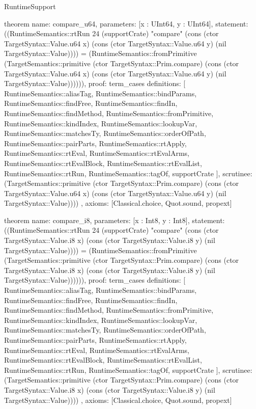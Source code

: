 \begin{lexlean}{RuntimeSupport}
\begin{semanticmodule}
theorem{
  name: compare_u64,
  parameters: [x : UInt64, y : UInt64],
  statement: ((RuntimeSemantics::rtRun 24 (supportCrate) "compare" (cons (ctor TargetSyntax::Value.u64 x) (cons (ctor TargetSyntax::Value.u64 y) (nil TargetSyntax::Value)))) = (RuntimeSemantics::fromPrimitive (TargetSemantics::primitive (ctor TargetSyntax::Prim.compare) (cons (ctor TargetSyntax::Value.u64 x) (cons (ctor TargetSyntax::Value.u64 y) (nil TargetSyntax::Value)))))),
  proof: term_cases{
    definitions: [
      RuntimeSemantics::aliasTag,
      RuntimeSemantics::bindParams,
      RuntimeSemantics::findFree,
      RuntimeSemantics::findIn,
      RuntimeSemantics::findMethod,
      RuntimeSemantics::fromPrimitive,
      RuntimeSemantics::kindIndex,
      RuntimeSemantics::lookupVar,
      RuntimeSemantics::matchesTy,
      RuntimeSemantics::orderOfPath,
      RuntimeSemantics::pairParts,
      RuntimeSemantics::rtApply,
      RuntimeSemantics::rtEval,
      RuntimeSemantics::rtEvalArms,
      RuntimeSemantics::rtEvalBlock,
      RuntimeSemantics::rtEvalList,
      RuntimeSemantics::rtRun,
      RuntimeSemantics::tagOf,
      supportCrate
    ],
    scrutinee: (TargetSemantics::primitive (ctor TargetSyntax::Prim.compare) (cons (ctor TargetSyntax::Value.u64 x) (cons (ctor TargetSyntax::Value.u64 y) (nil TargetSyntax::Value))))
  },
  axioms: [Classical.choice, Quot.sound, propext]
}

theorem{
  name: compare_i8,
  parameters: [x : Int8, y : Int8],
  statement: ((RuntimeSemantics::rtRun 24 (supportCrate) "compare" (cons (ctor TargetSyntax::Value.i8 x) (cons (ctor TargetSyntax::Value.i8 y) (nil TargetSyntax::Value)))) = (RuntimeSemantics::fromPrimitive (TargetSemantics::primitive (ctor TargetSyntax::Prim.compare) (cons (ctor TargetSyntax::Value.i8 x) (cons (ctor TargetSyntax::Value.i8 y) (nil TargetSyntax::Value)))))),
  proof: term_cases{
    definitions: [
      RuntimeSemantics::aliasTag,
      RuntimeSemantics::bindParams,
      RuntimeSemantics::findFree,
      RuntimeSemantics::findIn,
      RuntimeSemantics::findMethod,
      RuntimeSemantics::fromPrimitive,
      RuntimeSemantics::kindIndex,
      RuntimeSemantics::lookupVar,
      RuntimeSemantics::matchesTy,
      RuntimeSemantics::orderOfPath,
      RuntimeSemantics::pairParts,
      RuntimeSemantics::rtApply,
      RuntimeSemantics::rtEval,
      RuntimeSemantics::rtEvalArms,
      RuntimeSemantics::rtEvalBlock,
      RuntimeSemantics::rtEvalList,
      RuntimeSemantics::rtRun,
      RuntimeSemantics::tagOf,
      supportCrate
    ],
    scrutinee: (TargetSemantics::primitive (ctor TargetSyntax::Prim.compare) (cons (ctor TargetSyntax::Value.i8 x) (cons (ctor TargetSyntax::Value.i8 y) (nil TargetSyntax::Value))))
  },
  axioms: [Classical.choice, Quot.sound, propext]
}


\end{semanticmodule}
\end{lexlean}
